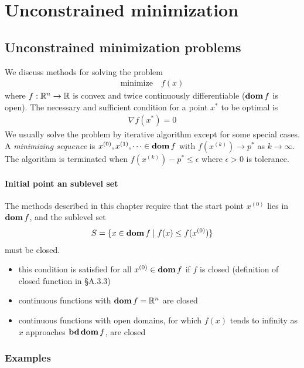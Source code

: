 \chapter{Unconstrained minimization}

\section{Unconstrained minimization problems}
We discuss methods for solving the problem
\begin{align}
  \text{minimize}\quad f(x)\label{eq:9.1}
\end{align}
where $f:\mathbb{R}^n\rightarrow\mathbb{R}$ is convex and twice continuously differentiable ($\mathop{\bf dom} f$ is open).
The necessary and sufficient condition for a point $x^\ast$ to be optimal is
\begin{align}
  \nabla f(x^\ast)=0\label{eq:9.2}
\end{align}
We usually solve the problem by iterative algorithm except for some special cases.
A \textit{minimizing sequence} is $x^{(0)},x^{(1)},\dots\in\mathop{\bf dom} f$ with $f(x^{(k)})\rightarrow p^\ast$ as $k\rightarrow \infty$.
The algorithm is terminated when $f(x^{(k)})-p^\ast\le \epsilon$ where $\epsilon>0$ is tolerance.

\subsubsection{Initial point an sublevel set}
The methods described in this chapter require that the start point $x^{(0)}$ lies in $\mathop{\bf dom} f$, and the sublevel set
\begin{align}
  S=\{x\in\mathop{\bf dom} f\mid f(x)\le f(x^{(0)})\}\label{eq:9.3}
\end{align}
must be closed.
\begin{itemize}
  \item this condition is satisfied for all $x^{(0)}\in\mathop{\bf dom} f$ if $f$ is closed (definition of closed function in \S A.3.3)
  \item continuous functions with $\mathop{\bf dom} f=\mathbb{R}^n$ are closed
  \item continuous functions with open domains, for which $f(x)$ tends to infinity as $x$ approaches $\mathop{\bf bd}\mathop{\bf dom} f$, are closed
\end{itemize}

\subsection{Examples}
